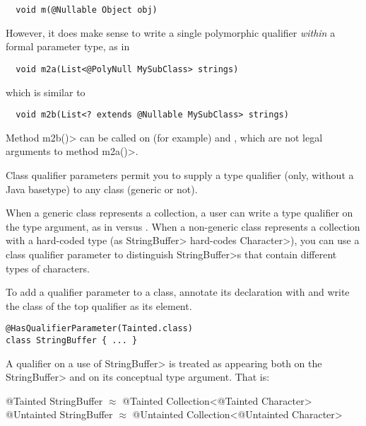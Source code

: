 \begin{Verbatim}
  void m(@Nullable Object obj)
\end{Verbatim}

However, it does make sense to write a single polymorphic qualifier
\emph{within} a formal parameter type, as in
\begin{Verbatim}
  void m2a(List<@PolyNull MySubClass> strings)
\end{Verbatim}
which is similar to
\begin{Verbatim}
  void m2b(List<? extends @Nullable MySubClass> strings)
\end{Verbatim}
Method \<m2b()> can be called on (for example)  and , which are not legal
arguments to method \<m2a()>.



Class qualifier parameters permit you to supply a type qualifier (only,
without a Java basetype) to any class (generic or not).

When a generic class represents a collection, a user can write a type
qualifier on the type argument, as in 
versus .  When a non-generic class
represents a collection with a hard-coded type (as \<StringBuffer>
hard-codes \<Character>), you can use a class qualifier parameter to
distinguish \<StringBuffer>s that contain different types of characters.

To add a qualifier parameter to a class, annotate its declaration with 
and write the class of the top qualifier as its element.

\begin{Verbatim}
@HasQualifierParameter(Tainted.class)
class StringBuffer { ... }
\end{Verbatim}

A qualifier on a use of \<StringBuffer> is treated as
appearing both on the \<StringBuffer> and on its conceptual type argument.  That
is:\\
\begin{tt}
  @Tainted StringBuffer $\approx$ @Tainted Collection<@Tainted Character>\\
  @Untainted StringBuffer $\approx$ @Untainted Collection<@Untainted Character>
\end{tt}

